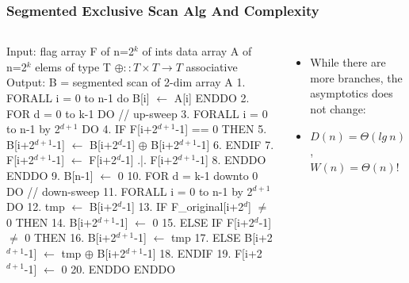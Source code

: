 \documentclass{beamer}
\renewcommand{\emph}[1]{\textcolor{structure}{#1}}
\newcommand{\emp}[1]{\textcolor{DikuRed}{ #1}}
\newcommand{\mymath}[1]{$ #1 $}
\newcommand{\myindu}[1]{^{#1}}
\begin{document}
\begin{frame}[fragile,t]
  \frametitle{Segmented Exclusive Scan Alg And Complexity}
\vspace{-2ex}
\begin{columns}
\begin{colorcode}[fontsize=\scriptsize]
Input:  flag array F of n=2\mymath{\myindu{k}} of ints
        data array A of n=2\mymath{\myindu{k}} elems of type T
        \mymath{\oplus::T\times T\rightarrow T} associative
Output: B = segmented scan of 2-dim array A
1.  \emph{FORALL i = 0 to n-1 do} B[i] \mymath{\leftarrow} A[i] \emph{ENDDO}
2.  \emp{FOR d = 0 to k-1 DO} \emph{// up-sweep}
3.    \emph{FORALL i = 0 to n-1 by 2\mymath{\myindu{d+1}} DO} 
4.      IF F[i+2\mymath{\myindu{d+1}}-1] == 0 THEN 
5.          B[i+2\mymath{\myindu{d+1}}-1] \mymath{\leftarrow} B[i+2\mymath{\myindu{d}}-1] \mymath{\oplus} B[i+2\mymath{\myindu{d+1}}-1]
6.      ENDIF
7.      F[i+2\mymath{\myindu{d+1}}-1] \mymath{\leftarrow} F[i+2\mymath{\myindu{d}}-1] .|. F[i+2\mymath{\myindu{d+1}}-1]
8.  \emp{ENDDO} \emph{ENDDO}
9.  B[n-1] \mymath{\leftarrow} 0
10. \emp{FOR d = k-1 downto 0 DO} \emph{// down-sweep}
11.   \emph{FORALL i = 0 to n-1 by 2\mymath{\myindu{d+1}} DO} 
12.     tmp \mymath{\leftarrow} B[i+2\mymath{\myindu{d}}-1]
13.     IF \alert{F\_original}[i+2\mymath{\myindu{d}}] \mymath{\neq} 0 THEN
14.          B[i+2\mymath{\myindu{d+1}}-1] \mymath{\leftarrow} 0
15.     ELSE IF F[i+2\mymath{\myindu{d}}-1] \mymath{\neq} 0 THEN
16.          B[i+2\mymath{\myindu{d+1}}-1] \mymath{\leftarrow} tmp
17.     ELSE B[i+2\mymath{\myindu{d+1}}-1] \mymath{\leftarrow} tmp \mymath{\oplus} B[i+2\mymath{\myindu{d+1}}-1]
18.     ENDIF
19.     F[i+2\mymath{\myindu{d+1}}-1] \mymath{\leftarrow} 0
20. \emp{ENDDO} \emph{ENDDO}
\end{colorcode}
\begin{itemize} 
    \item While there are more branches, the asymptotics 
            does not change:
    \item \emph{$D(n) = \Theta(lg \ n)$},\\\emp{$W(n) = \Theta(n)$!}
\end{itemize}
\end{columns}

\end{frame}
\end{document}
